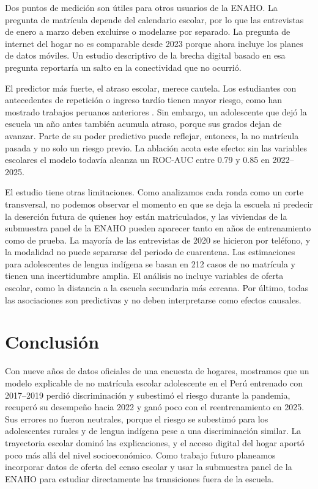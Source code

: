 \documentclass[conference]{IEEEtran}
\begin{document}
Dos puntos de medición son útiles para otros usuarios de la ENAHO. La pregunta de matrícula depende del calendario escolar, por lo que las entrevistas de enero a marzo deben excluirse o modelarse por separado. La pregunta de internet del hogar no es comparable desde 2023 porque ahora incluye los planes de datos móviles. Un estudio descriptivo de la brecha digital basado en esa pregunta reportaría un salto en la conectividad que no ocurrió.

El predictor más fuerte, el atraso escolar, merece cautela. Los estudiantes con antecedentes de repetición o ingreso tardío tienen mayor riesgo, como han mostrado trabajos peruanos anteriores \cite{cavero2011}. Sin embargo, un adolescente que dejó la escuela un año antes también acumula atraso, porque sus grados dejan de avanzar. Parte de su poder predictivo puede reflejar, entonces, la no matrícula pasada y no solo un riesgo previo. La ablación acota este efecto: sin las variables escolares el modelo todavía alcanza un ROC-AUC entre 0.79 y 0.85 en 2022--2025.

El estudio tiene otras limitaciones. Como analizamos cada ronda como un corte transversal, no podemos observar el momento en que se deja la escuela ni predecir la deserción futura de quienes hoy están matriculados, y las viviendas de la submuestra panel de la ENAHO pueden aparecer tanto en años de entrenamiento como de prueba. La mayoría de las entrevistas de 2020 se hicieron por teléfono, y la modalidad no puede separarse del periodo de cuarentena. Las estimaciones para adolescentes de lengua indígena se basan en 212 casos de no matrícula y tienen una incertidumbre amplia. El análisis no incluye variables de oferta escolar, como la distancia a la escuela secundaria más cercana. Por último, todas las asociaciones son predictivas y no deben interpretarse como efectos causales.

\section{Conclusión}

Con nueve años de datos oficiales de una encuesta de hogares, mostramos que un modelo explicable de no matrícula escolar adolescente en el Perú entrenado con 2017--2019 perdió discriminación y subestimó el riesgo durante la pandemia, recuperó su desempeño hacia 2022 y ganó poco con el reentrenamiento en 2025. Sus errores no fueron neutrales, porque el riesgo se subestimó para los adolescentes rurales y de lengua indígena pese a una discriminación similar. La trayectoria escolar dominó las explicaciones, y el acceso digital del hogar aportó poco más allá del nivel socioeconómico. Como trabajo futuro planeamos incorporar datos de oferta del censo escolar y usar la submuestra panel de la ENAHO para estudiar directamente las transiciones fuera de la escuela.
\end{document}
